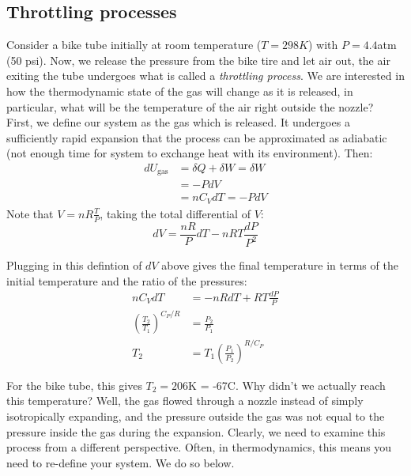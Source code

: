 \documentclass[12pt]{article}
\begin{document}
\subsection{Throttling processes}

 Consider a bike tube initially at room temperature ($T=298K$) with $P=4.4$atm (50 psi).  Now, we release the pressure from the bike tire and let air out, the air exiting the tube undergoes what is called a \emph{throttling process}. We are interested in how the thermodynamic state of the gas will change as it is released, in particular, what will be the temperature of the air right outside the nozzle?\\

First, we define our system as the gas which is released. It undergoes a sufficiently rapid expansion that the process can be approximated as adiabatic (not enough time for system to exchange heat with its environment). Then:
\begin{align*}
dU_\text{gas} &= \delta Q + \delta W = \delta W \\
&= -P dV\\
&= n C_V dT = -P dV
\end{align*}
Note that $V = nR\frac{T}{P}$, taking the total differential of $V$:
$$
dV = \frac{n R}{P} dT - nRT \frac{dP}{P^2}
$$


Plugging in this defintion of $dV$ above gives the final temperature in terms of the initial temperature and the ratio of the pressures:
\begin{align*}
nC_V dT &= -nRdT + RT \frac{dP}{P}\\
(\frac{T_2}{T_1})^{C_P/ R} &= \frac{P_2}{P_1}\\
T_2 &= T_1 (\frac{P_1}{P_2})^{R/C_P}
\end{align*}

For the bike tube, this gives $T_2 = 206$K = -67\degree C.  Why didn't we actually reach this temperature?  Well, the gas flowed through a nozzle instead of simply isotropically expanding, and the pressure outside the gas was not equal to the pressure inside the gas during the expansion. Clearly, we need to examine this process from a different perspective. Often, in thermodynamics, this means you need to re-define your system. We do so below.\\
\end{document}
